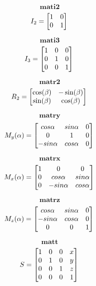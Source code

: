 \documentclass[10pt]{article}
\begin{document}
$$\textbf{mati2}$$
\[
    I_2 = \begin{bmatrix}
    1 & 0\\
    0 & 1 
    \end{bmatrix} \\
\]

$$\textbf{mati3}$$
\[
    I_3 = \begin{bmatrix}
        1 & 0 & 0\\
        0 & 1 & 0\\   
        0 & 0 & 1  
    \end{bmatrix} \\
\]

$$ \textbf{matr2} $$
\[
    R_2 = \begin{bmatrix}
    \cos(\beta) & -\sin(\beta)\\
    \sin(\beta) & \cos(\beta)
    \end{bmatrix} \\
\]

$$\textbf{matry}$$
\[
    M_{y}(\alpha) =\begin{bmatrix}
        cos\alpha & sin\alpha & 0\\
        0      &   1    & 0    \\  
        -sin\alpha & cos\alpha & 0   
    \end{bmatrix} \\
\]

$$\textbf{matrx}$$
\[
    M_{x}(\alpha) =\begin{bmatrix}
            1 &   0      &     0   \\         
            0 & cos\alpha & sin\alpha\\
            0 & -sin\alpha& cos\alpha   
    \end{bmatrix} \\
\]

$$\textbf{matrz}$$
\[
    M_{z}(\alpha) =\begin{bmatrix}
            cos\alpha & sin\alpha & 0\\
            -sin\alpha & cos\alpha & 0\\   
            0      &   0    & 1  
    \end{bmatrix} \\
\]

$$\textbf{matt}$$
\[
    S = \begin{bmatrix}
            1 & 0 & 0 & x\\
            0 & 1 & 0 & y\\   
            0 & 0 & 1 & z\\  
            0 & 0 & 0 & 1  
    \end{bmatrix} \\
\]
\end{document}
